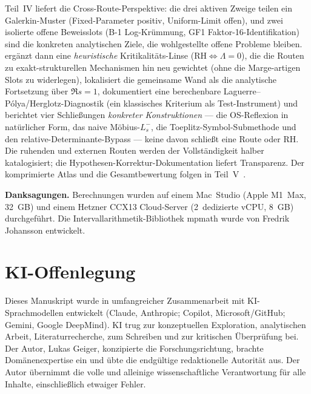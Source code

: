 \documentclass[12pt,a4paper]{article}
\theoremstyle{definition}
\theoremstyle{remark}
\begin{document}
Teil~IV liefert die Cross-Route-Perspektive: die drei aktiven Zweige
teilen ein Galerkin-Muster (Fixed-Parameter positiv, Uniform-Limit offen),
und zwei isolierte offene Beweisslots (B-1 Log-Krümmung, GF1
Faktor-16-Identifikation) sind die konkreten analytischen Ziele, die
wohlgestellte offene Probleme bleiben.  ergänzt dann eine
\emph{heuristische} Kritikalitäts-Linse ($\mathrm{RH}\Leftrightarrow\Lambda=0$), die
die Routen zu exakt-strukturellen Mechanismen hin neu gewichtet (ohne die
Marge-artigen Slots zu widerlegen), lokalisiert die gemeinsame Wand als die
analytische Fortsetzung über $\Re s=1$, dokumentiert eine berechenbare
Laguerre--P\'olya/Herglotz-Diagnostik (ein klassisches Kriterium als
Test-Instrument) und berichtet vier Schließungen \emph{konkreter Konstruktionen}
--- die OS-Reflexion in natürlicher Form, das naive Möbius-$L_s^-$, die
Toeplitz-Symbol-Submethode und den relative-Determinante-Bypass --- keine davon
schließt eine Route oder RH. Die
ruhenden und externen Routen werden der Vollständigkeit halber
katalogisiert; die Hypothesen-Korrektur-Dokumentation liefert Transparenz.
Der komprimierte Atlas und die Gesamtbewertung folgen in
Teil~V~\cite{Geiger2026partV}.


\bigskip
\noindent\textbf{Danksagungen.} Berechnungen wurden auf einem
Mac~Studio (Apple M1~Max, 32~GB) und einem Hetzner CCX13 Cloud-Server
(2~dedizierte vCPU, 8~GB) durchgeführt. Die Intervallarithmetik-Bibliothek
mpmath wurde von Fredrik Johansson entwickelt.


\section*{KI-Offenlegung}

Dieses Manuskript wurde in umfangreicher Zusammenarbeit mit
KI-Sprachmodellen entwickelt (Claude, Anthropic; Copilot,
Microsoft/GitHub; Gemini, Google DeepMind). KI trug zur konzeptuellen
Exploration, analytischen Arbeit, Literaturrecherche, zum Schreiben und
zur kritischen Überprüfung bei. Der Autor, Lukas Geiger, konzipierte die
Forschungsrichtung, brachte Domänenexpertise ein und übte die endgültige
redaktionelle Autorität aus. Der Autor übernimmt die volle und alleinige
wissenschaftliche Verantwortung für alle Inhalte, einschließlich
etwaiger Fehler.




\end{document}
